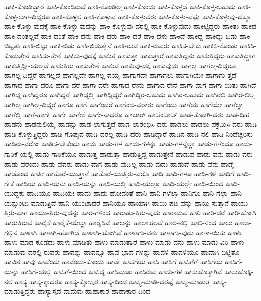 {ಹಾಕಿ-ಕೊಂಡಿದ್ದಾರೆ
ಹಾಕಿ-ಕೊಂಡಿರುವೆ
ಹಾಕಿ-ಕೊಂಡಿಲ್ಲ
ಹಾಕಿ-ಕೊಂಡು
ಹಾಕಿ-ಕೊಳ್ಳದೆ
ಹಾಕಿ-ಕೊಳ್ಳ-ಬಹುದು
ಹಾಕಿ-ಕೊಳ್ಳ-ಲಾಗ-ದಿದ್ದರೂ
ಹಾಕಿ-ಕೊಳ್ಳಲಿ
ಹಾಕಿ-ಕೊಳ್ಳುವ
ಹಾಕಿ-ಕೊಳ್ಳುವರು
ಹಾಕಿ-ಕೊಳ್ಳು-ವಷ್ಟು
ಹಾಕಿ-ಕೊಳ್ಳುವು-ದಕ್ಕೂ
ಹಾಕಿ-ಕೊಳ್ಳು-ವುದಕ್ಕೆ
ಹಾಕಿ-ಕೊಳ್ಳು-ವುದನ್ನು
ಹಾಕಿ-ಕೊಳ್ಳುವು-ದರಲ್ಲಿ
ಹಾಕಿ-ಕೊಳ್ಳುವುದು
ಹಾಕಿಟ್ಟಿದ್ದರು
ಹಾಕಿತು
ಹಾಕಿದ
ಹಾಕಿ-ದಂತಲ್ಲವೆ
ಹಾಕಿ-ದಂತೆ
ಹಾಕಿ-ದನು
ಹಾಕಿ-ದರು
ಹಾಕಿ-ದರೆ
ಹಾಕಿ-ದಳು
ಹಾಕಿದೆ
ಹಾಕಿದ್ದ
ಹಾಕಿದ್ದು-ಬಿಡು
ಹಾಕಿ-ಬಿಟ್ಟಿತ್ತು
ಹಾಕಿ-ಬಿಟ್ಟು
ಹಾಕಿ-ಬಿಡು
ಹಾಕಿ-ಬಿಡುತ್ತೇನೆ
ಹಾಕಿ-ರುವ
ಹಾಕಿ-ರುವರು
ಹಾಕಿಸ-ಬೇಕು
ಹಾಕಿಸಿ-ಕೊಂಡು
ಹಾಕಿಸಿ-ಕೊಡುತ್ತೇನೆ
ಹಾಕಿಸು-ತ್ತೇನೆ
ಹಾಕಿಸು-ವುದಕ್ಕೆ
ಹಾಕುತ್ತ
ಹಾಕುತ್ತಾ
ಹಾಕುತ್ತಾರೆ
ಹಾಕುತ್ತಿದ್ದನು
ಹಾಕುತ್ತಿದ್ದರು
ಹಾಕುತ್ತಿದ್ದಾಗ
ಹಾಕುತ್ತಿದ್ದೀ-ಯಲ್ಲವೆ
ಹಾಕುತ್ತಿರು
ಹಾಕುತ್ತೇನೆ
ಹಾಕುವ
ಹಾಕುವು-ದಕ್ಕೆ
ಹಾಕುವುದು
ಹಾಗಲ್ಲ
ಹಾಗಲ್ಲ-ದಿದ್ದರೂ
ಹಾಗಲ್ಲ-ದಿದ್ದರೆ
ಹಾಗಲ್ಲದೆ
ಹಾಗಲ್ಲದೇ
ಹಾಗಲ್ಲ-ವಯ್ಯ
ಹಾಗಾಗದೇ
ಹಾಗಾಗಲು
ಹಾಗಾಗಿಯೇ
ಹಾಗಾಗು-ತ್ತದೆ
ಹಾಗಾದ
ಹಾಗಾ-ದರೂ
ಹಾಗಾ-ದರೆ
ಹಾಗಾ-ದರೇ
ಹಾಗಾದ-ರೇನು
ಹಾಗಾದ-ರೇನೆ
ಹಾಗಾ-ದಾಗ
ಹಾಗಾ-ಯಿತು
ಹಾಗಿದೆ
ಹಾಗಿದ್ದ
ಹಾಗಿದ್ದರೂ
ಹಾಗಿದ್ದರೆ
ಹಾಗಿದ್ದಲ್ಲಿ
ಹಾಗಿದ್ದಿದ್ದರೆ
ಹಾಗಿದ್ದಿರ-ಬಹುದು
ಹಾಗಿರ-ಬಹುದು
ಹಾಗಿರಲಿ
ಹಾಗಿರ-ಲಿಲ್ಲ
ಹಾಗಿಲ್ಲ
ಹಾಗಿಲ್ಲ-ದಿದ್ದರೆ
ಹಾಗೂ
ಹಾಗೆ
ಹಾಗೆಂದರೆ
ಹಾಗೆಂದ-ವರಾರು
ಹಾಗೆಂದು
ಹಾಗೆಯೆ
ಹಾಗೆಯೇ
ಹಾಗೆಲ್ಲಾ
ಹಾಗೆಲ್ಲಿ
ಹಾಗೆ-ಹಾಗೇ
ಹಾಗೇ
ಹಾಗೇಕೆ
ಹಾಗೇ-ನಾದರೂ
ಹಾಜಾರ್
ಹಾಟೆಂಟಾಟ್
ಹಾಡ-ತೊಡಗಿ-ದರು
ಹಾಡ-ದಿಹ
ಹಾಡನು
ಹಾಡನುಲಿಯೈ
ಹಾಡನ್ನು
ಹಾಡ-ಲಾಗುತ್ತದೆ
ಹಾಡ-ಲಾರಂಭಿಸಿ-ದರು
ಹಾಡಲು
ಹಾಡಲು-ಪಕ್ರಮಿಸಿ-ದರು
ಹಾಡಿ
ಹಾಡಿ-ಕೊಳ್ಳುತ್ತಿದ್ದರು
ಹಾಡಿ-ಗೊಪ್ಪುವ
ಹಾಡಿ-ದರಲ್ಲ
ಹಾಡಿ-ದರು
ಹಾಡಿದ್ದಾರೆ
ಹಾಡಿನ
ಹಾಡಿ-ನಲಿ
ಹಾಡಿ-ನಿಂದೆಚ್ಚರಿಸು
ಹಾಡಿರು-ವರೋ
ಹಾಡಿಸ-ಬೇಕೆಂದು
ಹಾಡು
ಹಾಡು-ಗಳ
ಹಾಡು-ಗಳನ್ನು
ಹಾಡು-ಗಳನ್ನೆಲ್ಲಾ
ಹಾಡು-ಗಳೆಂದೂ
ಹಾಡು-ಗಾರಿಕೆ-ಯಲ್ಲಿ
ಹಾಡು-ಗಾರಿಕೆಯೂ
ಹಾಡುತ್ತ
ಹಾಡುತ್ತಾ
ಹಾಡುತ್ತಿದ್ದ
ಹಾಡುತ್ತೇನೆ
ಹಾಡುವ
ಹಾಡು-ವನು
ಹಾಡು-ವರು
ಹಾಡು-ವರೆಂದು
ಹಾಡು-ವವರು
ಹಾಡು-ವಾಗ
ಹಾಡು-ವುದಿಲ್ಲ
ಹಾಡು-ವುದು
ಹಾಡುವೆ
ಹಾಡು-ವೆನು
ಹಾಡೈ
ಹಾಡೊಂದ
ಹಾತೀ
ಹಾತೊರೆ-ಯುತ್ತಾನೆ
ಹಾತೊರೆ-ಯುತ್ತಿರು-ವರೊ
ಹಾದಿ
ಹಾದಿ-ಗಳೂ
ಹಾದಿ-ಗಳೆ
ಹಾದಿಗೆ
ಹಾದಿ-ಗೇಕೆ
ಹಾದಿಯ
ಹಾದಿ-ಯನು
ಹಾದಿ-ಯನ್ನು
ಹಾದಿ-ಯಲ್ಲಿ
ಹಾದಿ-ಯಲ್ಲೂ
ಹಾದಿ-ಯಲ್ಲೇ
ಹಾದಿ-ಯಿಂದ
ಹಾದಿ-ಯುದ್ದಕು
ಹಾದಿಯೂ
ಹಾದಿಯೇ
ಹಾದು
ಹಾದು-ಹೋದಂತೆ
ಹಾನಿ
ಹಾನಿ-ಗಳೆಲ್ಲಾ
ಹಾನಿಗೂ
ಹಾನಿ-ಗೆಲ್ಲಾ
ಹಾನಿ-ಯನ್ನುಂಟು-ಮಾಡುತ್ತಿದೆ
ಹಾನಿ-ಯುಂಟಾದರೆ
ಹಾನಿಯೂ
ಹಾಯಾಗಿ
ಹಾಯಿ-ಪಟ-ವನ್ನು
ಹಾಯಿ-ಸುತ್ತಾನೆ
ಹಾಯು-ತ್ತಿರು-ವಾಗ
ಹಾಯು-ತ್ತಿರು-ವುದನ್ನು
ಹಾರ-ಗಳಿಂದ
ಹಾರಾಡು-ತ್ತಿರು-ವುದು
ಹಾರಾಡುವ
ಹಾರಿ
ಹಾರಿ-ದರೆ
ಹಾರಿ-ಹೋಗಿ
ಹಾರುತ್ತಿರುವ
ಹಾರೈಕೆ
ಹಾರೈಕೆ-ಯೆಲ್ಲಾ
ಹಾರೈಸಿವೆ
ಹಾಲನ್ನು
ಹಾಲಾಹಲವೆ
ಹಾಲಿ-ನಲ್ಲಿ
ಹಾಲಿ-ನಿಂದ
ಹಾಲು
ಹಾಲು-ಗಲ್ಲಿನ
ಹಾಳಾಗಿ
ಹಾಳಾಗಿ-ಹೋಗಿದೆ
ಹಾಳಾಗಿ-ಹೋಗಿವೆ
ಹಾಳಾಗು-ವನು
ಹಾಳಾಗು-ವುದು
ಹಾಳಾ-ಯಿತು
ಹಾಳು
ಹಾಳು-ಮಾಡ-ಕೂಡದು
ಹಾಳು-ಮಾಡಿತು
ಹಾಳು-ಮಾಡುತ್ತಾರೆ
ಹಾಳು-ಮಾಡು-ವನು
ಹಾಳು-ಮಾಡು-ವಿರಿ
ಹಾಳು-ಮಾಡುವು-ದರಲ್ಲಿ-ರುವರು
ಹಾವನ್ನು
ಹಾವನ್ನೂ
ಹಾವ-ಭಾವ-ಗಳನ್ನು
ಹಾವಳಿ
ಹಾವಳಿಯೂ
ಹಾವಾಗಿ-ಬಿಟ್ಟಿತೊ
ಹಾವಿನ
ಹಾವು
ಹಾವೆಂದು
ಹಾವೆಂದು-ಕೊಂಡು
ಹಾವೇ
ಹಾಸಗೆಯ
ಹಾಸಿ
ಹಾಸಿಗೆ
ಹಾಸಿಗೆಗೆ
ಹಾಸಿಗೆಯ
ಹಾಸಿಗೆ-ಯನ್ನು
ಹಾಸಿಗೆ-ಯಲ್ಲಿ
ಹಾಸಿಗೆ-ಯಿಂದ
ಹಾಸಿದ್ದ
ಹಾಸಿಮುಖ
ಹಾಸಿರುವ
ಹಾಸು-ಗಳ
ಹಾಸುಹೊಕ್ಕಾಗಿವೆ
ಹಾಸುಹೊಕ್ಕಿ-ನಲಿ
ಹಾಸ್ಯ
ಹಾಸ್ಯ-ಕ್ಕಾದರೂ
ಹಾಸ್ಯ-ಕ್ಕೋಸ್ಕರ
ಹಾಸ್ಯ-ದಿಂದ
ಹಾಸ್ಯ-ಮಾಡಿ-ದರಷ್ಟೆ
ಹಾಸ್ಯ-ಮಾಡುತ್ತ
ಹಾಸ್ಯ-ಮಾಡುತ್ತಿದ್ದರು
ಹಾಸ್ಯಾಸ್ಪದ-ವಾದುವು
ಹಾಹಾಕಾರ
ಹಾಹಾಕಾರ-ದಿಂದ
}
